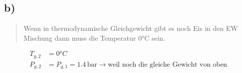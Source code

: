 

\subsection*{b)}

\begin{quote}
Wenn in thermodynamische Gleichgewicht gibt es noch Eis in den EW Mischung dann muss die Temperatur 0°C sein.
\end{quote}

\begin{align*}
T_{g,2} &= 0°C \\
P_{g,2} &= P_{g,1} = 1.4 \, \text{bar} \rightarrow \text{weil noch die gleiche Gewicht von oben}
\end{align*}